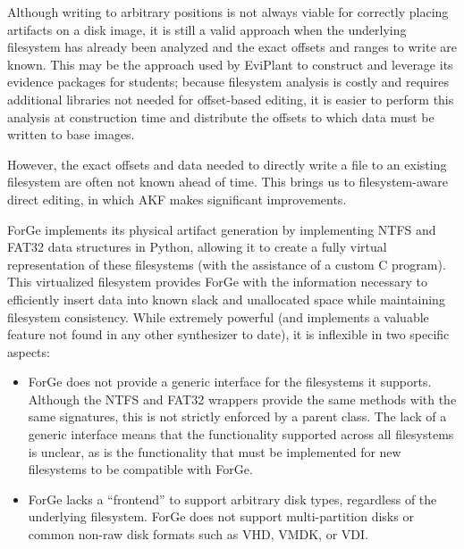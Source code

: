 \documentclass[letterpaper,12pt]{report}
\def\tightlist{}
\begin{document}
Although writing to arbitrary positions is not always viable for
correctly placing artifacts on a disk image, it is still a valid
approach when the underlying filesystem has already been analyzed and
the exact offsets and ranges to write are known. This may be the
approach used by EviPlant \cite{scanlonEviPlantEfficientDigital2017}
to construct and leverage its evidence packages for students; because
filesystem analysis is costly and requires additional libraries not
needed for offset-based editing, it is easier to perform this analysis
at construction time and distribute the offsets to which data must be
written to base images.

However, the exact offsets and data needed to directly write a file to
an existing filesystem are often not known ahead of time. This brings us
to filesystem-aware direct editing, in which AKF makes significant
improvements.

ForGe implements its physical artifact generation by implementing NTFS
and FAT32 data structures in Python, allowing it to create a fully
virtual representation of these filesystems (with the assistance of a
custom C program). This virtualized filesystem provides ForGe with the
information necessary to efficiently insert data into known slack and
unallocated space while maintaining filesystem consistency. While
extremely powerful (and implements a valuable feature not found in any
other synthesizer to date), it is inflexible in two specific aspects:

\begin{itemize}
\tightlist
\item
  ForGe does not provide a generic interface for the filesystems it
  supports. Although the NTFS and FAT32 wrappers provide the same
  methods with the same signatures, this is not strictly enforced by a
  parent class. The lack of a generic interface means that the
  functionality supported across all filesystems is unclear, as is the
  functionality that must be implemented for new filesystems to be
  compatible with ForGe.
\item
  ForGe lacks a ``frontend'' to support arbitrary disk types, regardless
  of the underlying filesystem. ForGe does not support multi-partition
  disks or common non-raw disk formats such as VHD, VMDK, or VDI.
\end{itemize}
\end{document}
